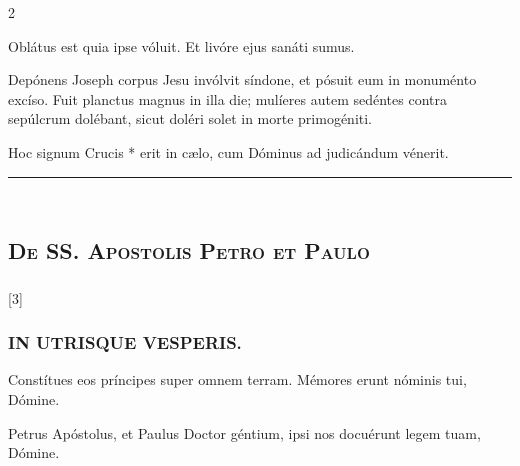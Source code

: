 \documentclass[9pt,twoside]{extarticle}
\begin{document}
\begin{multicols}{2}
\begin{tightlist}{}
\item {} Oblátus est quia ipse vóluit.  Et livóre ejus sanáti sumus.
\item {} Depónens Joseph corpus Jesu invólvit síndone, et pósuit eum in monuménto excíso. Fuit planctus magnus in illa die; mulíeres autem sedéntes contra sepúlcrum dolébant, sicut doléri solet in morte primogéniti.
\item {}
\item {} Hoc signum Crucis * erit in cælo, cum Dóminus ad judicándum vénerit.
\end{tightlist}

\begin{center}\textcolor{red}{\rule{\linewidth}{0.5pt}} \end{center}

\subsection*{\center {}}
\subsection*{\center \textsc{\\ De SS. Apostolis Petro et Paulo}}
\subsubsection*{\center {}}

\begin{tightlist}{}
\item {} [3] 
\end{tightlist}

\subsubsection*{\center \textsc{IN UTRISQUE VESPERIS.}}
\begin{tightlist}{}
\item {} Constítues eos príncipes super omnem terram.  Mémores erunt nóminis tui, Dómine.
\item {} Petrus Apóstolus, et Paulus Doctor géntium, ipsi nos docuérunt legem tuam, Dómine.
\end{tightlist}


\end{multicols}
\end{document}
